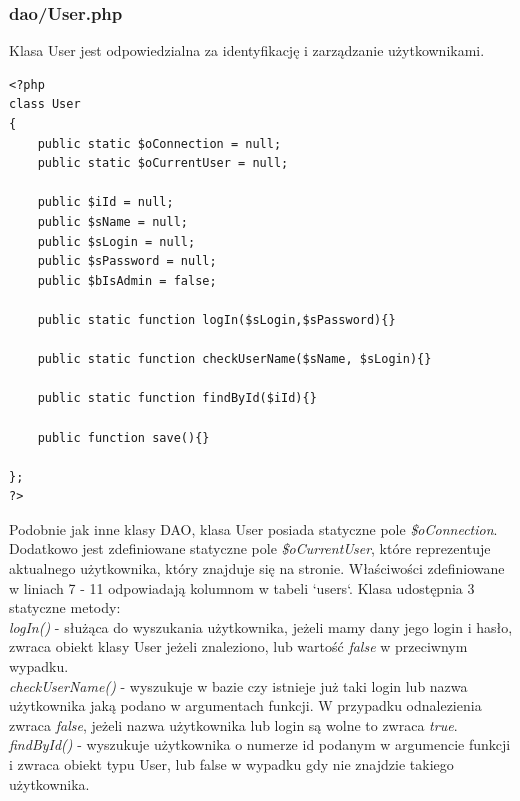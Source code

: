 \documentclass[a4paper,10pt]{article}
\begin{document}
\subsubsection{dao/User.php}
Klasa User jest odpowiedzialna za identyfikację i zarządzanie użytkownikami. \\
\begin{verbatim}
<?php
class User
{
	public static $oConnection = null;
	public static $oCurrentUser = null;

	public $iId = null;
	public $sName = null;
	public $sLogin = null;
	public $sPassword = null;
	public $bIsAdmin = false;
	
	public static function logIn($sLogin,$sPassword){}
	
	public static function checkUserName($sName, $sLogin){}
	
	public static function findById($iId){}
	
	public function save(){}

};
?>
\end{verbatim}
Podobnie jak inne klasy DAO, klasa User posiada statyczne pole \textit{\$oConnection}. Dodatkowo jest zdefiniowane statyczne pole \textit{\$oCurrentUser}, które reprezentuje aktualnego użytkownika, który znajduje się na stronie. Właściwości zdefiniowane w liniach 7 - 11 odpowiadają kolumnom w tabeli `users`. Klasa udostępnia 3 statyczne metody:\\ \textit{logIn()} - służąca do wyszukania użytkownika, jeżeli mamy dany jego login i hasło, zwraca obiekt klasy User jeżeli znaleziono, lub wartość \textit{false} w przeciwnym wypadku. \\ \textit{checkUserName()} - wyszukuje w bazie czy istnieje już taki login lub nazwa użytkownika jaką podano w argumentach funkcji. W przypadku odnalezienia zwraca \textit{false}, jeżeli nazwa użytkownika lub login są wolne to zwraca \textit{true}. \\
\textit{findById()} - wyszukuje użytkownika o numerze id podanym w argumencie funkcji i zwraca obiekt typu User, lub false w wypadku gdy nie znajdzie takiego użytkownika. \\
\end{document}
